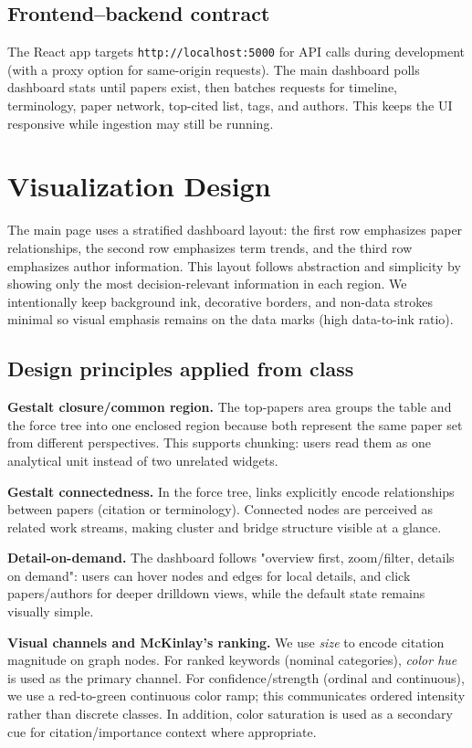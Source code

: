 \documentclass[sigconf]{acmart}
\begin{document}
\subsection{Frontend--backend contract}
The React app targets \texttt{http://localhost:5000} for API calls during development (with a proxy option for same-origin requests). The main dashboard polls dashboard stats until papers exist, then batches requests for timeline, terminology, paper network, top-cited list, tags, and authors. This keeps the UI responsive while ingestion may still be running.


\section{Visualization Design}
The main page uses a stratified dashboard layout: the first row emphasizes paper relationships, the second row emphasizes term trends, and the third row emphasizes author information. This layout follows abstraction and simplicity by showing only the most decision-relevant information in each region. We intentionally keep background ink, decorative borders, and non-data strokes minimal so visual emphasis remains on the data marks (high data-to-ink ratio).

\subsection{Design principles applied from class}
\textbf{Gestalt closure/common region.} The top-papers area groups the table and the force tree into one enclosed region because both represent the same paper set from different perspectives. This supports chunking: users read them as one analytical unit instead of two unrelated widgets.

\textbf{Gestalt connectedness.} In the force tree, links explicitly encode relationships between papers (citation or terminology). Connected nodes are perceived as related work streams, making cluster and bridge structure visible at a glance.

\textbf{Detail-on-demand.} The dashboard follows "overview first, zoom/filter, details on demand": users can hover nodes and edges for local details, and click papers/authors for deeper drilldown views, while the default state remains visually simple.

\textbf{Visual channels and McKinlay's ranking.} We use \emph{size} to encode citation magnitude on graph nodes. For ranked keywords (nominal categories), \emph{color hue} is used as the primary channel. For confidence/strength (ordinal and continuous), we use a red-to-green continuous color ramp; this communicates ordered intensity rather than discrete classes. In addition, color saturation is used as a secondary cue for citation/importance context where appropriate.
\end{document}
